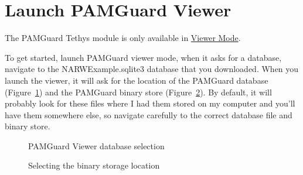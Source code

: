 \documentclass[
]{article}
\begin{document}
\section{Launch PAMGuard Viewer}\label{launch-pamguard-viewer}

The PAMGuard Tethys module is only available in
\href{https://www.pamguard.org/olhelp/overview/PamMasterHelp/docs/viewerMode.html}{Viewer
Mode}.

To get started, launch PAMGuard viewer mode, when it asks for a
database, navigate to the NARWExample.sqlite3 database that you
downloaded. When you launch the viewer, it will ask for the location of
the PAMGuard database (Figure~\ref{fig-launch}) and the PAMGuard binary
store (Figure~\ref{fig-binaryselect}). By default, it will probably look
for these files where I had them stored on my computer and you'll have
them somewhere else, so navigate carefully to the correct database file
and binary store.

\begin{figure}


\caption{\label{fig-launch}PAMGuard Viewer database selection}

\end{figure}%

\begin{figure}


\caption{\label{fig-binaryselect}Selecting the binary storage location}

\end{figure}%
\end{document}
